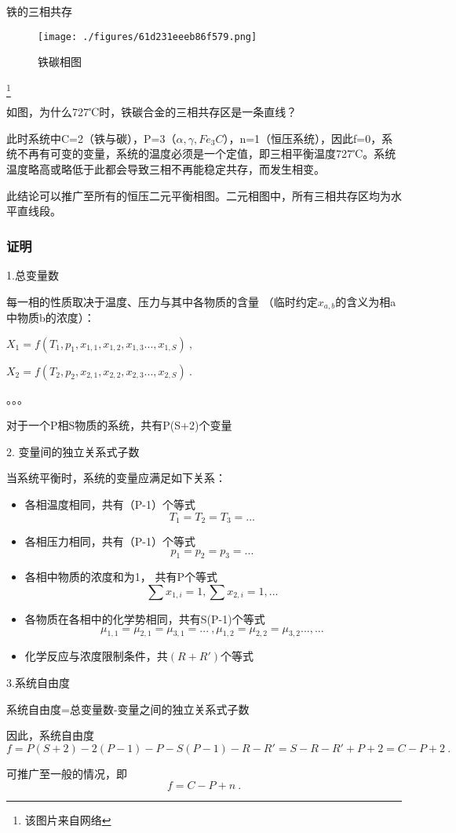 \begin{example}{铁的三相共存}
\begin{figure}[ht]
\centering
\texttt{[image: ./figures/61d231eeeb86f579.png]}
\caption{铁碳相图} \label{fig_GBPL_1}
\end{figure}
\footnote{该图片来自网络}

如图，为什么727℃时，铁碳合金的三相共存区是一条直线？

此时系统中C=2（铁与碳），P=3（$\alpha, \gamma, Fe_3C$），n=1（恒压系统），因此f=0，系统不再有可变的变量，系统的温度必须是一个定值，即三相平衡温度727℃。系统温度略高或略低于此都会导致三相不再能稳定共存，而发生相变。

此结论可以推广至所有的恒压二元平衡相图。二元相图中，所有三相共存区均为水平直线段。
\end{example}

\subsubsection{证明}
1.总变量数

每一相的性质取决于温度、压力与其中各物质的含量 （临时约定$x_{a,b}$的含义为相a中物质b的浓度）：

$X_1=f(T_1, p_1,x_{1,1},x_{1,2},x_{1,3}...,x_{1,S})~,$

$X_2=f(T_2,p_2,x_{2,1},x_{2,2},x_{2,3}...,x_{2,S})~.$

。。。

对于一个P相S物质的系统，共有P(S+2)个变量

2. 变量间的独立关系式子数

当系统平衡时，系统的变量应满足如下关系：

\begin{itemize}
\item 各相温度相同，共有（P-1）个等式
\begin{equation}
T_1=T_2=T_3=...~
\end{equation}
\item 各相压力相同，共有（P-1）个等式
\begin{equation}
p_1=p_2=p_3=...~
\end{equation}
\item 各相中物质的浓度和为1， 共有P个等式
\begin{equation}
\sum x_{1,i} = 1, \sum x_{2,i} = 1, ...~
\end{equation}
\item 各物质在各相中的化学势相同，共有S(P-1)个等式
\begin{equation}
\mu_{1,1}=\mu_{2,1}=\mu_{3,1}=...~, \mu_{1,2}=\mu_{2,2}=\mu_{3,2}..., ...~
\end{equation}
\item 化学反应与浓度限制条件，共$(R+R')$个等式
\end{itemize}

3.系统自由度

系统自由度=总变量数-变量之间的独立关系式子数

因此，系统自由度 
\begin{equation}
f = P(S+2) - 2(P-1) - P - S(P-1)-R-R'=S-R-R'+P+2=C-P+2~.
\end{equation}

可推广至一般的情况，即
\begin{equation}
f = C-P+n~.
\end{equation}

